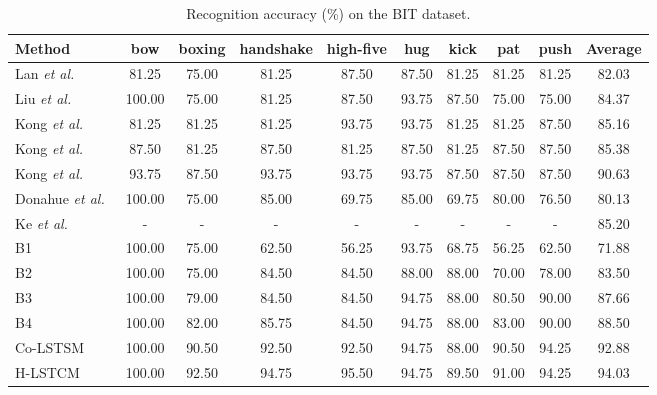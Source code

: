 \documentclass[9pt,journal,letterpaper,twocolumn]{IEEEtran}
\begin{document}
\begin{table*}[t]
	\caption{Recognition  accuracy (\%) on the BIT dataset.}
	\vspace{-3.5mm}
	{\scriptsize
		\begin{center}
			\begin{tabular}{lccccccccc}
				\hline
				\centering
				Method & bow & boxing & handshake & high-five & hug & kick & pat & push & Average \\
				\hline
				Lan {\em et al.}~\cite{lan2012discriminative} & 81.25 & 75.00 & 81.25 & 87.50 & 87.50 & 81.25 & 81.25 & 81.25 & 82.03 \\
				Liu {\em et al.}~\cite{liu2011recognizing} & 100.00 & 75.00 & 81.25 & 87.50 & 93.75 & 87.50 & 75.00 & 75.00 & 84.37 \\
				Kong {\em et al.}~\cite{kong2012leraning} & 81.25 & 81.25 & 81.25 & 93.75 & 93.75 & 81.25 & 81.25 & 87.50 & 85.16 \\
				Kong {\em et al.}~\cite{kong2016close} & 87.50 & 81.25 & 87.50 & 81.25 & 87.50 & 81.25 & 87.50 & 87.50 & 85.38 \\
				Kong {\em et al.}~\cite{kong2014interactive} & 93.75 & 87.50 & {93.75} & {93.75} & 93.75 & 87.50 & 87.50 & 87.50 & 90.63 \\
				Donahue {\em et al.}~\cite{donahue2015long} & 100.00 & 75.00 & 85.00&	69.75& 85.00& 69.75	&80.00	&76.50 &80.13 \\
				Ke {\em et al.}~\cite{ke2016spatial} & - & - &	-&	-&	-&	-&	-&	- & 85.20 \\
				\hline
				B1    & 100.00 & 75.00& 62.50& 	56.25& 	93.75& 	68.75& 	56.25& 	62.50& 	71.88\\
				B2      & 100.00 & 75.00&	84.50&	84.50&	88.00&	88.00&	70.00&	78.00&	83.50 \\
				B3      & 100.00 & 79.00& 84.50&	84.50&	{94.75}&	88.00&	80.50&	90.00&	87.66
				\\
				B4　& 100.00	& 82.00 &	85.75 &	84.50 & 94.75 &	88.00	& 83.00	& 90.00 & 88.50
				
				\\
				{Co-LSTSM}~\cite{shu2017concurrence}　& {100.00} &	{90.50} &	{92.50} &	{92.50} &	{94.75}&	{88.00} &	{90.50} &	{94.25} &	{92.88}	
				\\
				{H-LSTCM}　& {100.00} &	{92.50} &	{94.75} &	{95.50} &	{94.75}&	{89.50} &	{91.00} &	{94.25} &	{94.03}	
				\\
				\hline
			\end{tabular}
		\end{center}
	}
\vspace{-3mm}
	\label{BIT_results}
\end{table*}
	
\end{document}
